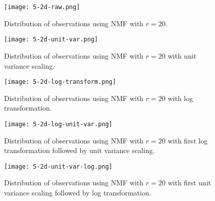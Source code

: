 \begin{figure}[H]
	\centering
	\texttt{[image: 5-2d-raw.png]}
	\caption{Distribution of observations using NMF with $r=20$.}
	\label{fig:5p2d}
\end{figure}

\begin{figure}[H]
	\centering
	\texttt{[image: 5-2d-unit-var.png]}
	\caption{Distribution of observations using NMF with $r=20$ with unit variance scaling.}
	\label{fig:5p2dunitvar}
\end{figure}

\begin{figure}[H]
	\centering
	\texttt{[image: 5-2d-log-transform.png]}
	\caption{Distribution of observations using NMF with $r=20$ with log transformation.}
	\label{fig:5p2dlog}
\end{figure}

\begin{figure}[H]
	\centering
	\texttt{[image: 5-2d-log-unit-var.png]}
	\caption{Distribution of observations using NMF with $r=20$ with first log transformation followed by unit variance scaling.}
	\label{fig:5p2dloguv}
\end{figure}

\begin{figure}[H]
	\centering
	\texttt{[image: 5-2d-unit-var-log.png]}
	\caption{Distribution of observations using NMF with $r=20$ with first unit variance scaling followed by log transformation.}
	\label{fig:5p2duvlog}
\end{figure}